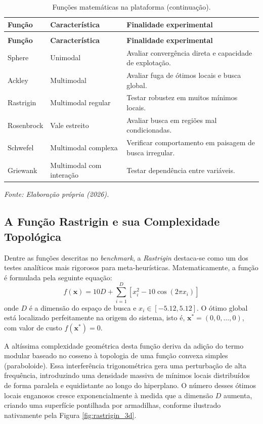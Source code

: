 \documentclass[12pt, a4paper, oneside]{report}
\begin{document}
\begin{longtable}{p{2.5cm} p{4.0cm} p{7.5cm}} 
\caption{Funções matemáticas na plataforma.} \label{tab:funcoes-matematicas} \\
\toprule 
\textbf{Função} & \textbf{Característica} & \textbf{Finalidade experimental}\\ 
\midrule \endfirsthead 
\caption[]{Funções matemáticas na plataforma (continuação).} \\
\toprule \textbf{Função} & \textbf{Característica} & \textbf{Finalidade experimental}\\ \midrule \endhead 
Sphere & Unimodal & Avaliar convergência direta e capacidade de explotação.\\ 
Ackley & Multimodal & Avaliar fuga de ótimos locais e busca global.\\ 
Rastrigin & Multimodal regular & Testar robustez em muitos mínimos locais.\\ 
Rosenbrock & Vale estreito & Avaliar busca em regiões mal condicionadas.\\ 
Schwefel & Multimodal complexa & Verificar comportamento em paisagem de busca irregular.\\ 
Griewank & Multimodal com interação & Testar dependência entre variáveis.\\ 
\bottomrule 
\end{longtable}
\vspace{-0.5cm}
\centerline{\small \textit{Fonte: Elaboração própria (2026).}}
\vspace{0.5cm}


\subsection{A Função Rastrigin e sua Complexidade Topológica}

Dentre as funções descritas no \textit{benchmark}, a \textit{Rastrigin} destaca-se como um dos testes analíticos mais rigorosos para meta-heurísticas. Matematicamente, a função é formulada pela seguinte equação:
\begin{equation}
    f(\mathbf{x}) = 10D + \sum_{i=1}^{D} \left[ x_i^2 - 10 \cos(2 \pi x_i) \right]
\end{equation}
onde $D$ é a dimensão do espaço de busca e $x_i \in [-5.12, 5.12]$. O ótimo global está localizado perfeitamente na origem do sistema, isto é, $\mathbf{x}^* = (0, 0, \dots, 0)$, com valor de custo $f(\mathbf{x}^*) = 0$.

A altíssima complexidade geométrica desta função deriva da adição do termo modular baseado no cosseno à topologia de uma função convexa simples (paraboloide). Essa interferência trigonométrica gera uma perturbação de alta frequência, introduzindo uma densidade massiva de mínimos locais distribuídos de forma paralela e equidistante ao longo do hiperplano. O número desses ótimos locais enganosos cresce exponencialmente à medida que a dimensão $D$ aumenta, criando uma superfície pontilhada por armadilhas, conforme ilustrado nativamente pela Figura \ref{fig:rastrigin_3d}.
\end{document}
